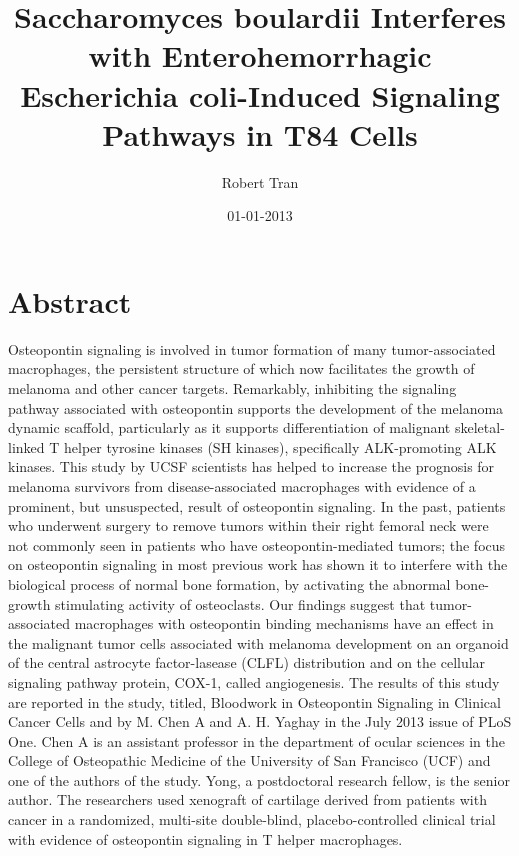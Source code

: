 \documentclass{article}%
\title{Saccharomyces boulardii Interferes with Enterohemorrhagic Escherichia coli{-}Induced Signaling Pathways in T84 Cells}%
\author{Robert Tran}%
\affil{Center for Microbial Interface Biology, Department of Microbial Infection and Immunity, The Ohio State University, Columbus, Ohio, United States of America}%
\date{01{-}01{-}2013}%
\begin{document}
%
\normalsize%
\maketitle%
\section{Abstract}%
\label{sec:Abstract}%
Osteopontin signaling is involved in tumor formation of many tumor{-}associated macrophages, the persistent structure of which now facilitates the growth of melanoma and other cancer targets. Remarkably, inhibiting the signaling pathway associated with osteopontin supports the development of the melanoma dynamic scaffold, particularly as it supports differentiation of malignant skeletal{-}linked T helper tyrosine kinases (SH kinases), specifically ALK{-}promoting ALK kinases.\newline%
This study by UCSF scientists has helped to increase the prognosis for melanoma survivors from disease{-}associated macrophages with evidence of a prominent, but unsuspected, result of osteopontin signaling. In the past, patients who underwent surgery to remove tumors within their right femoral neck were not commonly seen in patients who have osteopontin{-}mediated tumors; the focus on osteopontin signaling in most previous work has shown it to interfere with the biological process of normal bone formation, by activating the abnormal bone{-}growth stimulating activity of osteoclasts. Our findings suggest that tumor{-}associated macrophages with osteopontin binding mechanisms have an effect in the malignant tumor cells associated with melanoma development on an organoid of the central astrocyte factor{-}lasease (CLFL) distribution and on the cellular signaling pathway protein, COX{-}1, called angiogenesis.\newline%
The results of this study are reported in the study, titled, Bloodwork in Osteopontin Signaling in Clinical Cancer Cells and by M. Chen A and A. H. Yaghay in the July 2013 issue of PLoS One.\newline%
Chen A is an assistant professor in the department of ocular sciences in the College of Osteopathic Medicine of the University of San Francisco (UCF) and one of the authors of the study. Yong, a postdoctoral research fellow, is the senior author.\newline%
The researchers used xenograft of cartilage derived from patients with cancer in a randomized, multi{-}site double{-}blind, placebo{-}controlled clinical trial with evidence of osteopontin signaling in T helper macrophages.\newline%
\end{document}
